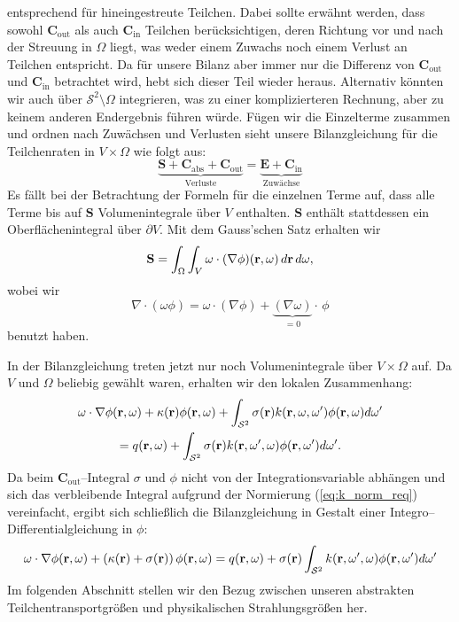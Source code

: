 	entsprechend für hineingestreute Teilchen. Dabei sollte erwähnt werden, dass sowohl $\mathbf{C}_\text{out}$ als auch $\mathbf{C}_\text{in}$ Teilchen berücksichtigen, deren Richtung vor und nach der Streuung in $\Omega$ liegt, was weder einem Zuwachs noch einem Verlust an Teilchen entspricht. Da für unsere Bilanz aber immer nur die Differenz von $\mathbf{C}_\text{out}$ und $\mathbf{C}_\text{in}$ betrachtet wird, hebt sich dieser Teil wieder heraus. Alternativ könnten wir auch über $\mathcal{S}^2 \setminus \Omega$ integrieren, was zu einer komplizierteren Rechnung, aber zu keinem anderen Endergebnis führen würde. Fügen wir die Einzelterme zusammen und ordnen nach Zuwächsen und Verlusten sieht unsere Bilanzgleichung für die Teilchenraten in $V \times \Omega$ wie folgt aus:
	$$\underbrace{\mathbf{S}+\mathbf{C}_\text{abs}+\mathbf{C}_\text{out}}_\text{Verluste}=\underbrace{\mathbf{E}+\mathbf{C}_\text{in}}_\text{Zuwächse}$$
	Es fällt bei der Betrachtung der Formeln für die einzelnen Terme auf, dass alle Terme bis auf $\mathbf{S}$ Volumenintegrale über $V$ enthalten. $\mathbf{S}$ enthält stattdessen ein Oberflächenintegral über $\partial V$. Mit dem Gauss'schen Satz erhalten wir
	$$\mathbf{S}=\int_\Omega \int_V \omega \cdot (\nabla\phi)(\mathbf{r},\omega)\,d\mathbf{r}\,d\omega,$$
	wobei wir $$\nabla \cdot(\omega\phi)=\omega\cdot(\nabla\phi)+\underbrace{(\nabla\omega)}_{=0}\cdot\,\phi$$ benutzt haben.
	
	In der Bilanzgleichung treten jetzt nur noch Volumenintegrale über $V \times \Omega$ auf. Da $V$ und $\Omega$ beliebig gewählt waren, erhalten wir den lokalen Zusammenhang:
	\begin{multline*}
	  \omega\cdot\nabla\phi(\mathbf{r},\omega)+\kappa(\mathbf{r})\phi(\mathbf{r},\omega)+\int_{\mathcal{S}^2}\sigma(\mathbf{r})k(\mathbf{r},\omega,\omega')\phi(\mathbf{r},\omega)d\omega' \\
	  =q(\mathbf{r},\omega)+\int_{\mathcal{S}^2}\sigma(\mathbf{r})k(\mathbf{r},\omega',\omega)\phi(\mathbf{r},\omega')d\omega'.
	\end{multline*}
	Da beim $\mathbf{C}_\text{out}$--Integral $\sigma$ und $\phi$ nicht von der Integrationsvariable abhängen und sich das verbleibende Integral aufgrund der Normierung (\ref{eq:k_norm_req}) vereinfacht, ergibt sich schließlich die Bilanzgleichung in Gestalt einer Integro--Differentialgleichung in $\phi$:
	\begin{equation}\label{eq:particle_balance_equation}
	  \omega\cdot\nabla\phi(\mathbf{r},\omega)+\left(\kappa(\mathbf{r})+\sigma(\mathbf{r})\right)\phi(\mathbf{r},\omega)
	  =q(\mathbf{r},\omega)+\sigma(\mathbf{r})\int_{\mathcal{S}^2}k(\mathbf{r},\omega',\omega)\phi(\mathbf{r},\omega')d\omega'
	\end{equation}
	Im folgenden Abschnitt stellen wir den Bezug zwischen unseren abstrakten Teilchentransportgrößen und physikalischen Strahlungsgrößen her.


